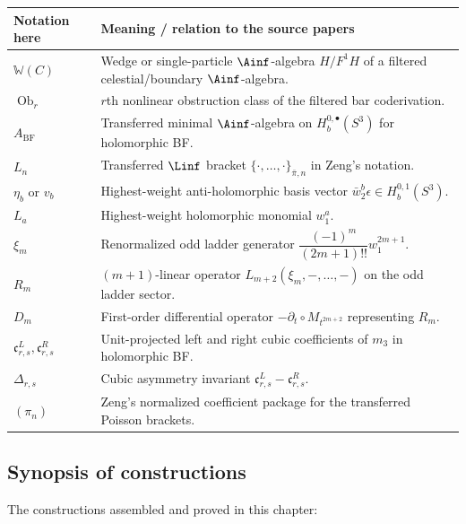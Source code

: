 \begin{longtable}{>{\raggedright\arraybackslash}p{}>{\raggedright\arraybackslash}p{}}
\toprule
\textbf{Notation here} & \textbf{Meaning / relation to the source papers}\\
\midrule
$\mathbb{W}(C)$ & Wedge or single-particle $\Ainf$-algebra $H/F^1H$ of a filtered celestial/boundary $\Ainf$-algebra.\\
$\operatorname{Ob}_r$ & $r$th nonlinear obstruction class of the filtered bar coderivation.\\
$A_{\mathrm{BF}}$ & Transferred minimal $\Ainf$-algebra on $H_b^{0,\bullet}(S^3)$ for holomorphic BF.\\
$L_n$ & Transferred $\Linf$ bracket $\{\cdot,\dots,\cdot\}_{\bar\pi,n}$ in Zeng's notation.\\
$\eta_b$ or $v_b$ & Highest-weight anti-holomorphic basis vector $\bar w_2^b\epsilon \in H_b^{0,1}(S^3)$.\\
$L_a$ & Highest-weight holomorphic monomial $w_1^a$.\\
$\xi_m$ & Renormalized odd ladder generator $\dfrac{(-1)^m}{(2m+1)!!}w_1^{2m+1}$.\\
$R_m$ & $(m+1)$-linear operator $L_{m+2}(\xi_m,-,\dots,-)$ on the odd ladder sector.\\
$D_m$ & First-order differential operator $-\partial_t\circ M_{t^{2m+2}}$ representing $R_m$.\\
$\mathfrak c^L_{r,s},\mathfrak c^R_{r,s}$ & Unit-projected left and right cubic coefficients of $m_3$ in holomorphic BF.\\
$\Delta_{r,s}$ & Cubic asymmetry invariant $\mathfrak c^L_{r,s}-\mathfrak c^R_{r,s}$.\\
$(\pi_n)$ & Zeng's normalized coefficient package for the transferred Poisson brackets.\\
\bottomrule
\end{longtable}

\subsection{Synopsis of constructions}
\label{sec:cbt-inventory}

The constructions assembled and proved in this chapter:

